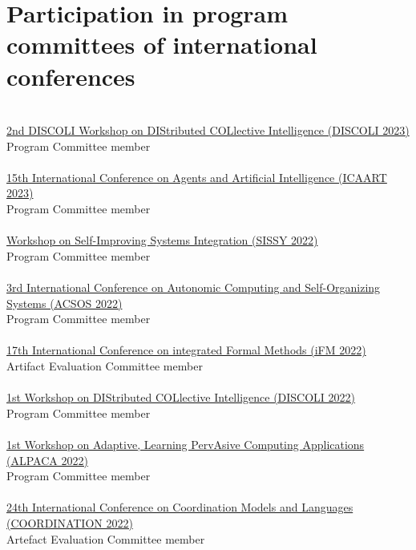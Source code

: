 \section{{\color{black}Participation in program committees of international conferences}}
\halfblankline \\
\href{https://discoli-workshop.github.io/2023/}{2nd DISCOLI Workshop on DIStributed COLlective Intelligence (DISCOLI 2023)
}
\\ Program Committee member \\
\halfblankline \\
\href{https://icaart.scitevents.org/}{15th International Conference on Agents and Artificial Intelligence
(ICAART 2023)}
\\ Program Committee member \\
\halfblankline \\
\href{https://sissy.telecom-paristech.fr/}{Workshop on Self-Improving Systems Integration (SISSY 2022)}
\\ Program Committee member \\
\halfblankline \\
\href{https://conf.researchr.org/home/acsos-2022/}{3rd International Conference on Autonomic Computing and Self-Organizing Systems
(ACSOS 2022)}
\\ Program Committee member \\
\halfblankline \\
\href{https://ifm22.si.usi.ch/}{17th International Conference on integrated Formal Methods
(iFM 2022)}
\\ Artifact Evaluation Committee member \\
\halfblankline \\
\href{https://discoli-workshop.github.io/2022/}{1st Workshop on DIStributed COLlective Intelligence
(DISCOLI 2022)}
\\ Program Committee member \\
\halfblankline \\
\href{https://www.discotec.org/2022/coordination}{1st Workshop on Adaptive, Learning PervAsive Computing Applications
(ALPACA 2022)}
\\ Program Committee member \\
\halfblankline \\
\href{https://www.discotec.org/2022/coordination}{24th International Conference on Coordination Models and Languages 
(COORDINATION 2022)}
\\ Artefact Evaluation Committee member \\
